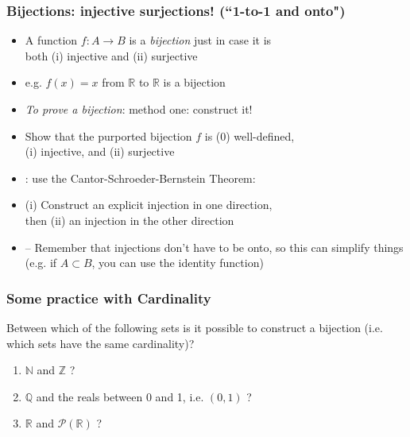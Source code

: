\begin{frame}
\frametitle{Bijections: injective surjections! (``1-to-1 and onto")}

\begin{itemize}[<+->]

\item A function $f: A \rightarrow B$ is a \emph{bijection} just in case it is \\ both (i) injective and (ii) surjective

\item[] e.g. $f(x) = x$ from $\mathbb{R}$ to $\mathbb{R}$ is a bijection 

\item \emph{To prove a bijection}: method one: construct it! 
\item[] Show that the purported bijection $f$ is (0) well-defined, \\ (i) injective, and (ii) surjective

\item {}: use the Cantor-Schroeder-Bernstein Theorem:
\item[] (i) Construct an explicit injection in one direction, \\ then (ii) an injection in the other direction
\item[] -- Remember that injections don't have to be onto, so this can simplify things (e.g. if $A \subset B$, you can use the identity function)


\end{itemize}
\end{frame}


\begin{frame}
\frametitle{Some practice with Cardinality}
Between which of the following sets is it possible to construct a bijection (i.e. which sets have the same cardinality)?

\begin{enumerate}[<+->]

\item $\mathbb{N}$ and $\mathbb{Z}$ ? 

\item $\mathbb{Q}$ and the reals between 0 and 1, i.e. $(0, 1)$ ?

\item $\mathbb{R}$ and $\mathscr{P}(\mathbb{R})$ ? 

\end{enumerate}

\end{frame}


